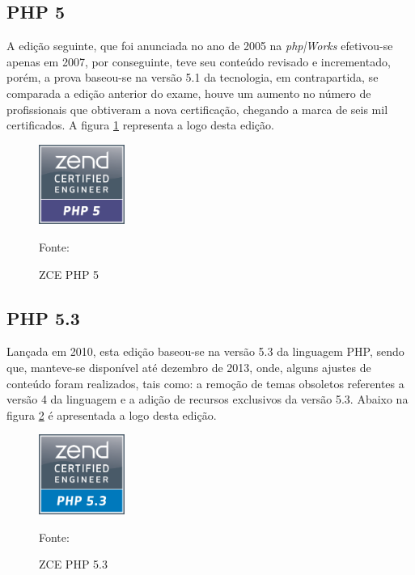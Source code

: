 \subsection{PHP 5}

A edição seguinte, que foi anunciada no ano de 2005 na \textit{php|Works}
efetivou-se apenas em 2007, por conseguinte, teve seu conteúdo revisado e
incrementado, porém, a prova baseou-se na versão 5.1 da tecnologia, em
contrapartida, se comparada a edição anterior do exame, houve um aumento no
número de profissionais que obtiveram a nova certificação, chegando a marca de
seis mil certificados. A figura \ref{fig:logoCertificationPHP5} representa a
logo desta edição.

\begin{figure}[h!tb]
	\caption{ZCE PHP 5}
	\label{fig:logoCertificationPHP5}

	\centering
	\includegraphics[width=0.25\textwidth]{images/logo/php5.png}

	\centering
	\footnotesize Fonte: 
\end{figure}

\FloatBarrier 	%

\subsection{PHP 5.3}

Lançada em 2010, esta edição baseou-se na versão 5.3 da linguagem \acs{PHP},
sendo que, manteve-se disponível até dezembro de 2013, onde, alguns ajustes de
conteúdo foram realizados, tais como: a remoção de temas obsoletos referentes a versão 4
da linguagem e a adição de recursos exclusivos da versão 5.3. Abaixo na figura
\ref{fig:logoCertificationPHP53} é apresentada a logo desta edição.

\begin{figure}[h!tb]
	\caption{ZCE PHP 5.3}
	\label{fig:logoCertificationPHP53}

	\centering
	\includegraphics[width=0.25\textwidth]{images/logo/php5-3.png}

	\centering
	\footnotesize Fonte: 
\end{figure}

